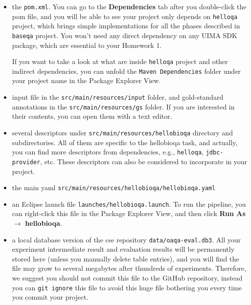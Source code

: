 \begin{itemize}

\item the \texttt{pom.xml}. You can go to the \textbf{Dependencies} tab after
you double-click the pom file, and you will be able to see your project only
depends on \texttt{helloqa} project, which brings simple implementations for all
the phases described in \texttt{baseqa} project. You won't need any direct
dependency on any UIMA SDK package, which are essential to your Homework 1.

If you want to take a look at what are inside \texttt{helloqa} project and
other indirect dependencies, you can unfold the \texttt{Maven Dependencies}
folder under your project name in the Package Explorer View.

\item input file in the \texttt{src/main/resources/input} folder, and
gold-standard annotations in the \texttt{src/main/resources/gs} folder. If you
are interested in their contents, you can open them with a text editor.

\item several descriptors under \texttt{src/main/resources/hellobioqa} directory
and subdirectories. All of them are specific to the hellobioqa task, and
actually, you can find more descriptors from dependencies, e.g.,
\texttt{helloqa}, \texttt{jdbc-provider}, etc. These descriptors can also be
considered to incorporate in your project.

\item the main yaml \texttt{src/main/resources/hellobioqa/hellobioqa.yaml}

\item an Eclipse launch file \texttt{launches/hellobioqa.launch}. To run the
pipeline, you can right-click this file in the Package Explorer View, and then
click \textbf{Run As} $\rightarrow$ \textbf{hellobioqa}.

\item a local database version of the cse repository
\texttt{data/oaqa-eval.db3}. All your experiment intermediate result and
evaluation results will be permanently stored here (unless you manually delete
table entries), and you will find the file may grow to several megabytes after
thundreds of experiments. Therefore, we suggest you should not commit this file
to the GitHub repository, instead you can \texttt{git ignore} this file to avoid
this huge file bothering you every time you commit your project.

\end{itemize}

